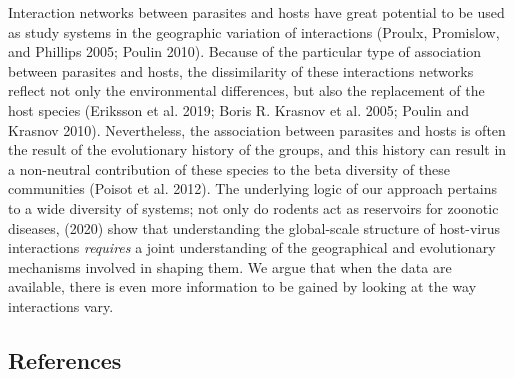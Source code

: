 \documentclass[12pt]{article}
\begin{document}
Interaction networks between parasites and hosts have great potential to
be used as study systems in the geographic variation of interactions
(Proulx, Promislow, and Phillips 2005; Poulin 2010). Because of the
particular type of association between parasites and hosts, the
dissimilarity of these interactions networks reflect not only the
environmental differences, but also the replacement of the host species
(Eriksson et al. 2019; Boris R. Krasnov et al. 2005; Poulin and Krasnov
2010). Nevertheless, the association between parasites and hosts is
often the result of the evolutionary history of the groups, and this
history can result in a non-neutral contribution of these species to the
beta diversity of these communities (Poisot et al. 2012). The underlying
logic of our approach pertains to a wide diversity of systems; not only
do rodents act as reservoirs for zoonotic diseases, (2020) show that
understanding the global-scale structure of host-virus interactions
\emph{requires} a joint understanding of the geographical and
evolutionary mechanisms involved in shaping them. We argue that when the
data are available, there is even more information to be gained by
looking at the way interactions vary.

\hypertarget{references}{%
\subsection*{References}\label{references}}
\end{document}
